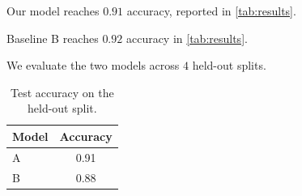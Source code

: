 \documentclass{article}
\begin{document}
Our model reaches $0.91$ accuracy, reported in \autoref{tab:results}.

Baseline B reaches $0.92$ accuracy in \autoref{tab:results}.

We evaluate the two models across $4$ held-out splits.

\begin{table}
\caption{Test accuracy on the held-out split.}\label{tab:results}
\begin{tabular}{l|c}
\hline
Model & Accuracy \\
\hline
A & 0.91 \\
B & 0.88 \\
\hline
\end{tabular}
\end{table}
\end{document}
